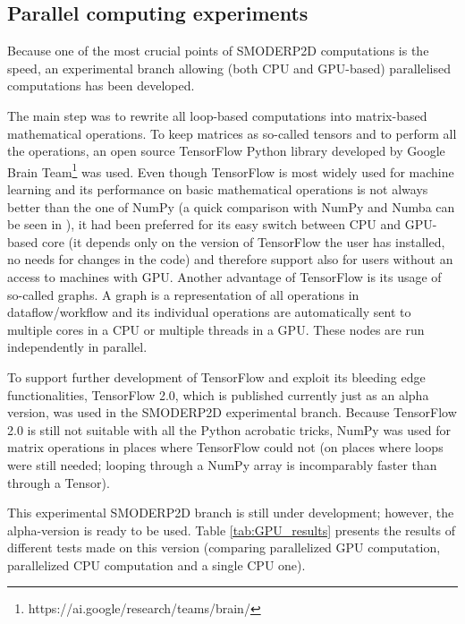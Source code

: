 \subsection{Parallel computing experiments}

Because one of the most crucial points of SMODERP2D computations is
the speed, an experimental branch allowing (both CPU and GPU-based)
parallelised computations has been developed.

The main step was to rewrite all loop-based computations into
matrix-based mathematical operations. To keep matrices as so-called
tensors and to perform all the operations, an open source  TensorFlow Python
library \cite{tensorflow2015-whitepaper} developed by Google Brain
Team\footnote{https://ai.google/research/teams/brain/} was used. Even though
TensorFlow is most widely used for machine learning
and its performance on basic mathematical operations is not always better
than the one of NumPy (a quick comparison with NumPy and Numba can be
seen in \cite{tf-np}), it had been preferred for its easy switch
between CPU and GPU-based core (it depends only on the version of
TensorFlow the user has installed, no needs for changes in the code) and
therefore support also for users without an access to machines with
GPU. Another advantage of TensorFlow is its usage of so-called
graphs. A graph is a representation of all operations in
dataflow/workflow and its individual operations are automatically sent
to multiple cores in a CPU or multiple threads in a GPU. These nodes
are run independently in parallel.

To support further development of TensorFlow and exploit its bleeding
edge functionalities, TensorFlow 2.0, which is published currently
just as an alpha version, was used in the SMODERP2D experimental
branch. Because TensorFlow 2.0 is still not suitable with all the
Python acrobatic tricks, NumPy was used for matrix operations in
places where TensorFlow could not (on places where loops were still
needed; looping through a NumPy array is incomparably faster than
through a Tensor).

This experimental SMODERP2D branch is still under development;
however, the alpha-version is ready to be used. Table \ref{tab:GPU_results}
presents the results of different tests made on this version
(comparing parallelized GPU computation, parallelized CPU computation and a single CPU one).

